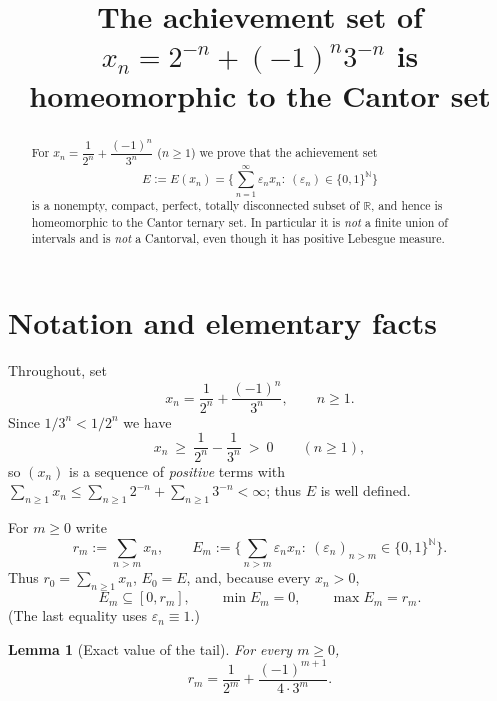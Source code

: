 \documentclass{amsart}
\newtheorem{lemma}{Lemma}
\theoremstyle{definition}
\begin{document}
\title{The achievement set of $x_n=2^{-n}+(-1)^n3^{-n}$ is homeomorphic to the Cantor set}
\maketitle

\begin{abstract}
For $x_n=\dfrac{1}{2^n}+\dfrac{(-1)^n}{3^n}$ ($n\ge 1$) we prove that the achievement set
$$E:=E(x_n)=\Big\{\textstyle\sum_{n=1}^{\infty}\varepsilon_n x_n:\ (\varepsilon_n)\in\{0,1\}^{\mathbb N}\Big\}$$
is a nonempty, compact, perfect, totally disconnected subset of $\mathbb R$, and hence is
homeomorphic to the Cantor ternary set. In particular it is \emph{not} a finite union of
intervals and is \emph{not} a Cantorval, even though it has positive Lebesgue measure.
\end{abstract}

\section{Notation and elementary facts}

Throughout, set
\begin{equation}\label{eq:xn}
x_n=\frac{1}{2^n}+\frac{(-1)^n}{3^n},\qquad n\ge 1 .
\end{equation}
Since $1/3^n<1/2^n$ we have
\begin{equation}\label{eq:pos}
x_n\ \ge\ \frac{1}{2^n}-\frac{1}{3^n}\ >\ 0\qquad(n\ge 1),
\end{equation}
so $(x_n)$ is a sequence of \emph{positive} terms with $\sum_{n\ge1}x_n\le\sum_{n\ge1}2^{-n}+\sum_{n\ge1}3^{-n}<\infty$; thus $E$ is well defined.

For $m\ge 0$ write
$$r_m:=\sum_{n>m}x_n ,\qquad E_m:=\Big\{\textstyle\sum_{n>m}\varepsilon_n x_n:\ (\varepsilon_n)_{n>m}\in\{0,1\}^{\mathbb N}\Big\}.$$
Thus $r_0=\sum_{n\ge1}x_n$, $E_0=E$, and, because every $x_n>0$,
\begin{equation}\label{eq:tailbounds}
E_m\subseteq[0,r_m],\qquad \min E_m=0,\qquad \max E_m=r_m .
\end{equation}
(The last equality uses $\varepsilon_n\equiv 1$.)

\begin{lemma}[Exact value of the tail]\label{lem:rm}
For every $m\ge 0$,
\begin{equation}\label{eq:rm}
r_m=\frac{1}{2^{m}}+\frac{(-1)^{m+1}}{4\cdot 3^{m}} .
\end{equation}
\end{lemma}
\end{document}

